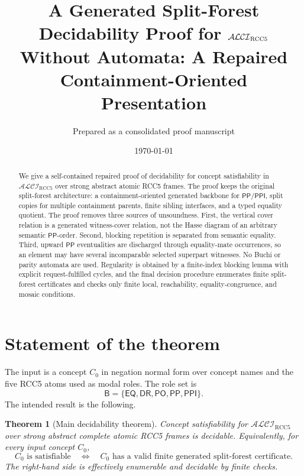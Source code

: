 \documentclass[11pt]{article}
\title{A Generated Split-Forest Decidability Proof for $\Logic$\\
       Without Automata: A Repaired Containment-Oriented Presentation}
\author{Prepared as a consolidated proof manuscript}
\date{\today}
\newtheorem{theorem}{Theorem}[section]
\newcommand{\Logic}{\mathcal{ALCI}_{\mathrm{RCC5}}}
\newcommand{\Base}{\mathsf{B}}
\newcommand{\EQ}{\mathsf{EQ}}
\newcommand{\DR}{\mathsf{DR}}
\newcommand{\PO}{\mathsf{PO}}
\newcommand{\PP}{\mathsf{PP}}
\newcommand{\PPI}{\mathsf{PPI}}
\begin{document}
\maketitle

\begin{abstract}
We give a self-contained repaired proof of decidability for concept satisfiability in $\Logic$ over strong abstract atomic RCC5 frames.  The proof keeps the original split-forest architecture: a containment-oriented generated backbone for $\PP/\PPI$, split copies for multiple containment parents, finite sibling interfaces, and a typed equality quotient.  The proof removes three sources of unsoundness.  First, the vertical cover relation is a generated witness-cover relation, not the Hasse diagram of an arbitrary semantic $\PP$-order.  Second, blocking repetition is separated from semantic equality.  Third, upward $\PP$ eventualities are discharged through equality-mate occurrences, so an element may have several incomparable selected superpart witnesses.  No Buchi or parity automata are used.  Regularity is obtained by a finite-index blocking lemma with explicit request-fulfilled cycles, and the final decision procedure enumerates finite split-forest certificates and checks only finite local, reachability, equality-congruence, and mosaic conditions.
\end{abstract}

\tableofcontents

\section{Statement of the theorem}

The input is a concept $C_0$ in negation normal form over concept names and the five RCC5 atoms used as modal roles.  The role set is
\[
  \Base=\{\EQ,\DR,\PO,\PP,\PPI\}.
\]
The intended result is the following.

\begin{theorem}[Main decidability theorem]\label{thm:main}
Concept satisfiability for $\Logic$ over strong abstract complete atomic RCC5 frames is decidable.
Equivalently, for every input concept $C_0$,
\[
  C_0 \text{ is satisfiable}
  \quad\Longleftrightarrow\quad
  C_0 \text{ has a valid finite generated split-forest certificate}.
\]
The right-hand side is effectively enumerable and decidable by finite checks.
\end{theorem}
\end{document}
